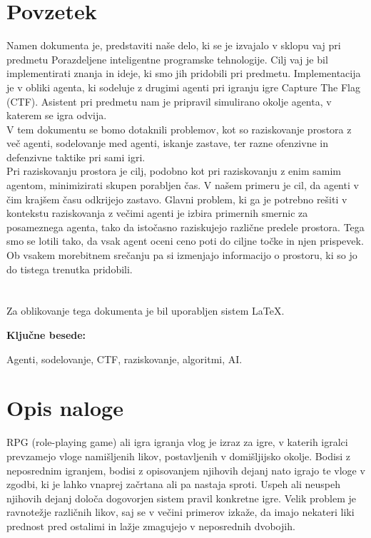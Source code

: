 \documentclass[12pt,a4paper,openany]{book}
\begin{document}
\chapter*{Povzetek}

Namen dokumenta je, predstaviti naše delo, ki se je izvajalo v sklopu vaj pri predmetu
 Porazdeljene inteligentne programske tehnologije. Cilj vaj je bil implementirati znanja
 in ideje, ki smo jih pridobili pri predmetu. Implementacija je v obliki agenta, ki sodeluje
 z drugimi agenti pri igranju igre Capture The Flag (CTF). Asistent pri predmetu nam je pripravil
 simulirano okolje agenta, v katerem se igra odvija.
\\
V tem dokumentu se bomo dotaknili problemov, kot so raziskovanje prostora z več agenti, sodelovanje med agenti, 
iskanje zastave, ter razne ofenzivne in defenzivne taktike pri sami igri.
\\
Pri raziskovanju prostora je cilj, podobno kot pri raziskovanju z enim samim agentom, minimizirati skupen porabljen čas.
 V našem primeru je cil, da agenti v čim krajšem času odkrijejo zastavo. Glavni problem, ki ga je potrebno rešiti v kontekstu
 raziskovanja z večimi agenti je izbira primernih smernic za posameznega agenta, tako da istočasno raziskujejo različne predele 
prostora. Tega smo se lotili tako, da vsak agent oceni ceno poti do ciljne točke in njen prispevek. Ob vsakem morebitnem srečanju 
pa si izmenjajo informacijo o prostoru, ki so jo do tistega trenutka pridobili.\\
\\
\\
Za oblikovanje tega dokumenta je bil uporabljen sistem \LaTeX.

\vspace{1.3cm}
\noindent
{\large \bf Ključne besede:}

\vspace{0.5cm}
\noindent
Agenti, sodelovanje, CTF, raziskovanje, algoritmi, AI.




\chapter{Opis naloge}
RPG (role-playing game) ali igra igranja vlog je izraz za igre, v katerih igralci prevzamejo vloge namišljenih likov, postavljenih v domišljijsko okolje. Bodisi z neposrednim igranjem, bodisi z opisovanjem njihovih dejanj nato igrajo te vloge v zgodbi, ki je lahko vnaprej začrtana ali pa nastaja sproti. Uspeh ali neuspeh njihovih dejanj določa dogovorjen sistem pravil konkretne igre. Velik problem je ravnotežje različnih likov, saj se v večini primerov izkaže, da imajo nekateri liki prednost pred ostalimi in lažje zmagujejo v neposrednih dvobojih.
\end{document}
